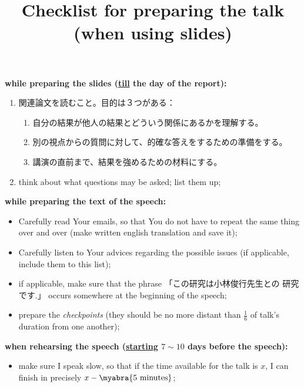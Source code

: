 \documentclass[12pt]{article} %
\title{Checklist for preparing the talk (when using slides)}
\newcommand{\kana}[2]{\ruby{#1}{#2}}
\begin{document}
	\maketitle
    \noindent\textbf{while preparing the slides (\underline{till} the day of the report):}
    \begin{enumerate}
	    \item 関連論文を読むこと。目的は３つがある：\begin{enumerate}
			    \item 自分の結果が他人の結果とどういう関係にあるかを理解する。　
			    \item 別の視点からの質問に対して、的確な答えをするための準備をする。
			    \item 講演の直前まで、結果を強めるための材料にする。
		    \end{enumerate}
        \item think about what questions may be asked; list them up;
    \end{enumerate}
	\noindent\textbf{while preparing the text of the speech:}
	\begin{itemize}
		\item Carefully read Your emails, so that You do not have to repeat the same thing over and over (make written english translation
			and save it);
		\item Carefully listen to Your advices regarding the possible issues (if applicable, include them to this list);
		\item if applicable, make sure that the phrase 「この研究は小林俊行先生との\kana{共同}{キョウドウ}
            研究です.」 occurs somewhere at the beginning of the speech;
        \item prepare the {\it checkpoints} (they should be no more distant than $\frac{1}{6}$ of talk's duration
            from one another);
	\end{itemize}
    \textbf{when rehearsing the speech (\underline{starting} $7\sim10$ days before the speech):}
	\begin{itemize}
		\item make sure I speak slow, so that if the time available for the talk is $x$, I can finish in precisely $x-\myabra{\mbox{5 minutes}}$;
	\end{itemize}
\end{document}
